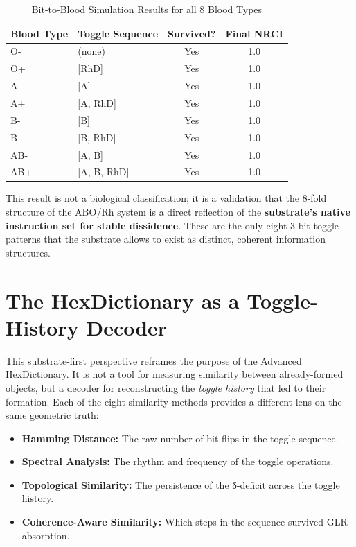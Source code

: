 \documentclass[11pt]{article}
\begin{document}
\begin{table}[h!]
\centering
\caption{Bit-to-Blood Simulation Results for all 8 Blood Types}
\begin{tabular}{llcc}
\toprule
\textbf{Blood Type} & \textbf{Toggle Sequence} & \textbf{Survived?} & \textbf{Final NRCI} \\
\midrule
O- & (none) & Yes & 1.0 \\
O+ & [RhD] & Yes & 1.0 \\
A- & [A] & Yes & 1.0 \\
A+ & [A, RhD] & Yes & 1.0 \\
B- & [B] & Yes & 1.0 \\
B+ & [B, RhD] & Yes & 1.0 \\
AB- & [A, B] & Yes & 1.0 \\
AB+ & [A, B, RhD] & Yes & 1.0 \\
\bottomrule
\end{tabular}
\label{tab:results}
\end{table}

This result is not a biological classification; it is a validation that the 8-fold structure of the ABO/Rh system is a direct reflection of the \textbf{substrate’s native instruction set for stable dissidence}. These are the only eight 3-bit toggle patterns that the substrate allows to exist as distinct, coherent information structures.

\section{The HexDictionary as a Toggle-History Decoder}

This substrate-first perspective reframes the purpose of the Advanced HexDictionary. It is not a tool for measuring similarity between already-formed objects, but a decoder for reconstructing the \textit{toggle history} that led to their formation. Each of the eight similarity methods provides a different lens on the same geometric truth:

\begin{itemize}
    \item \textbf{Hamming Distance:} The raw number of bit flips in the toggle sequence.
    \item \textbf{Spectral Analysis:} The rhythm and frequency of the toggle operations.
    \item \textbf{Topological Similarity:} The persistence of the δ-deficit across the toggle history.
    \item \textbf{Coherence-Aware Similarity:} Which steps in the sequence survived GLR absorption.
\end{itemize}
\end{document}
